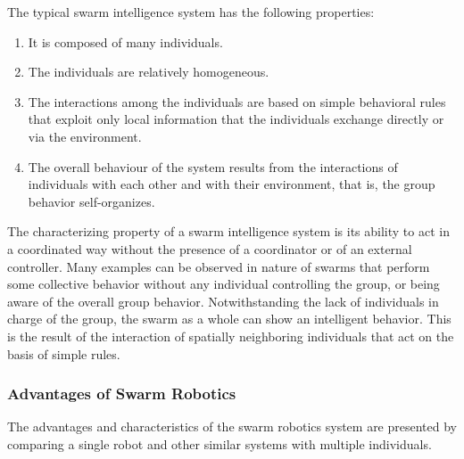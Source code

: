 The typical swarm intelligence system has the following properties:
\begin{enumerate}
\item It is composed of many individuals.
\item The individuals are relatively homogeneous.
\item The interactions among the individuals are based on simple behavioral rules that exploit only local information that the individuals exchange directly or via the environment.
\item The overall behaviour of the system results from the interactions of individuals with each other and with their environment, that is, the group behavior self-organizes.
\end{enumerate}
The characterizing property of a swarm intelligence system is its ability to act in a coordinated way without the presence of a coordinator or of an external controller. Many examples can be observed in nature of swarms that perform some collective behavior without any individual controlling the group, or being aware of the overall group behavior. Notwithstanding the lack of individuals in charge of the group, the swarm as a whole can show an intelligent behavior. This is the result of the interaction of spatially neighboring individuals that act on the basis of simple rules.
\subsubsection{Advantages of Swarm Robotics}
The advantages and characteristics of the swarm robotics system are presented by comparing a single robot and other similar systems with multiple individuals.
